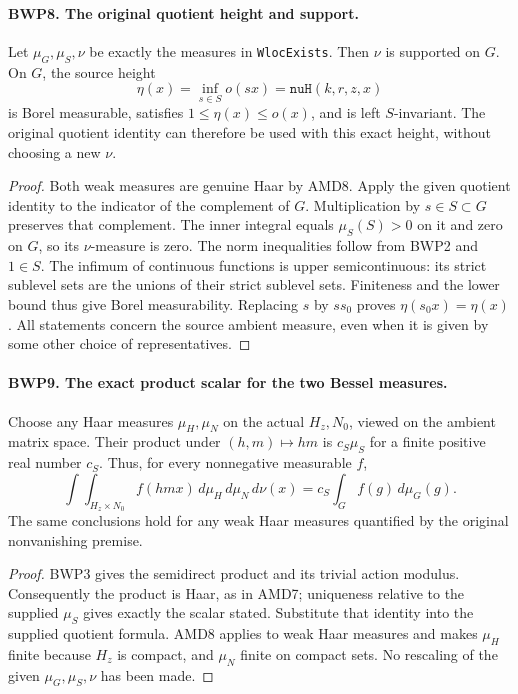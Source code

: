 \paragraph{BWP8. The original quotient height and support.}
\label{claim:BWP8}
Let \(\mu_G,\mu_S,\nu\) be exactly the measures in
\texttt{WlocExists}.  Then \(\nu\) is supported on \(G\).
On \(G\), the source height
\[
 \eta(x)=\inf_{s\in S}o(sx)=\texttt{nuH}(k,r,z,x)
 \tag{BWP.14}
\]
is Borel measurable, satisfies \(1\le\eta(x)\le o(x)\),
and is left \(S\)-invariant.  The original quotient identity can
therefore be used with this exact height, without choosing a new \(\nu\).

\begin{proof}
Both weak measures are genuine Haar by AMD8.  Apply the given
quotient identity to the indicator of the complement of \(G\).
Multiplication by \(s\in S\subset G\) preserves that complement.
The inner integral equals \(\mu_S(S)>0\) on it and zero on
\(G\), so its \(\nu\)-measure is zero.  The norm inequalities
follow from BWP2 and \(1\in S\).  The infimum of continuous
functions is upper semicontinuous: its strict sublevel sets are the
unions of their strict sublevel sets.  Finiteness and the lower bound
thus give Borel measurability.  Replacing \(s\) by \(ss_0\)
proves \(\eta(s_0x)=\eta(x)\).  All statements concern the
source ambient measure, even when it is given by some other choice
of representatives.
\end{proof}

\paragraph{BWP9. The exact product scalar for the two Bessel measures.}
\label{claim:BWP9}
Choose any Haar measures \(\mu_H,\mu_N\) on the actual
\(H_z,N_0\), viewed on the ambient matrix space.  Their product
under \((h,m)\mapsto hm\) is \(c_S\mu_S\) for a finite
positive real number \(c_S\).  Thus, for every nonnegative
measurable \(f\),
\[
 \int\!\int_{H_z\times N_0} f(hmx)\,d\mu_H\,d\mu_N\,d\nu(x)
 =c_S\int_G f(g)\,d\mu_G(g).
 \tag{BWP.15}
\]
The same conclusions hold for any weak Haar measures quantified by
the original nonvanishing premise.

\begin{proof}
BWP3 gives the semidirect product and its trivial action modulus.
Consequently the product is Haar, as in AMD7; uniqueness relative to
the supplied \(\mu_S\) gives exactly the scalar stated.  Substitute
that identity into the supplied quotient formula.  AMD8 applies to
weak Haar measures and makes \(\mu_H\) finite because \(H_z\)
is compact, and \(\mu_N\) finite on compact sets.  No rescaling of
the given \(\mu_G,\mu_S,\nu\) has been made.
\end{proof}


